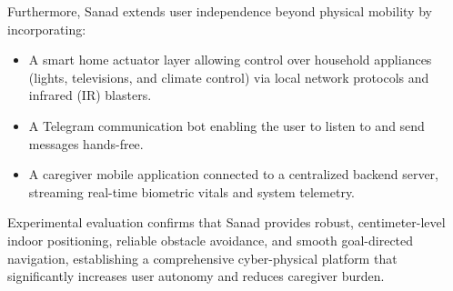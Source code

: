 Furthermore, Sanad extends user independence beyond physical mobility by incorporating:
\begin{itemize}[itemsep=0pt, parsep=0pt, topsep=0pt]
    \item A smart home actuator layer allowing control over household appliances (lights, televisions, and climate control) via local network protocols and infrared (IR) blasters.
    \item A Telegram communication bot enabling the user to listen to and send messages hands-free.
    \item A caregiver mobile application connected to a centralized backend server, streaming real-time biometric vitals and system telemetry.
\end{itemize}

Experimental evaluation confirms that Sanad provides robust, centimeter-level indoor positioning, reliable obstacle avoidance, and smooth goal-directed navigation, establishing a comprehensive cyber-physical platform that significantly increases user autonomy and reduces caregiver burden.
